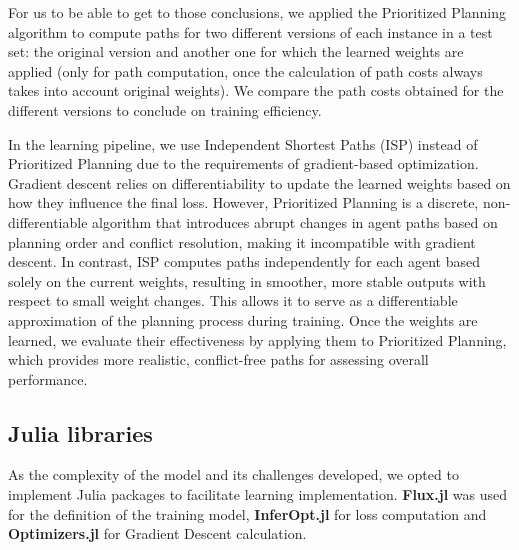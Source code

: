 For us to be able to get to those conclusions, we applied the Prioritized Planning algorithm to compute paths for two different versions of each instance in a test set: the original version and another one for which the learned weights are applied (only for path computation, once the calculation of path costs always takes into account original weights). We compare the path costs obtained for the different versions to conclude on training efficiency.

In the learning pipeline, we use Independent Shortest Paths (ISP) instead of Prioritized Planning due to the requirements of gradient-based optimization. Gradient descent relies on differentiability to update the learned weights based on how they influence the final loss. However, Prioritized Planning is a discrete, non-differentiable algorithm that introduces abrupt changes in agent paths based on planning order and conflict resolution, making it incompatible with gradient descent. In contrast, ISP computes paths independently for each agent based solely on the current weights, resulting in smoother, more stable outputs with respect to small weight changes. This allows it to serve as a differentiable approximation of the planning process during training. Once the weights are learned, we evaluate their effectiveness by applying them to Prioritized Planning, which provides more realistic, conflict-free paths for assessing overall performance.

\subsection{Julia libraries}

As the complexity of the model and its challenges developed, we opted to implement Julia packages to facilitate learning implementation. \textbf{Flux.jl} \cite{Flux.jl-2018} was used for the definition of the training model, \textbf{InferOpt.jl} \cite{dalleLearningCombinatorialOptimization2022} for loss computation and \textbf{Optimizers.jl} \cite{optimisersjl} for Gradient Descent calculation.